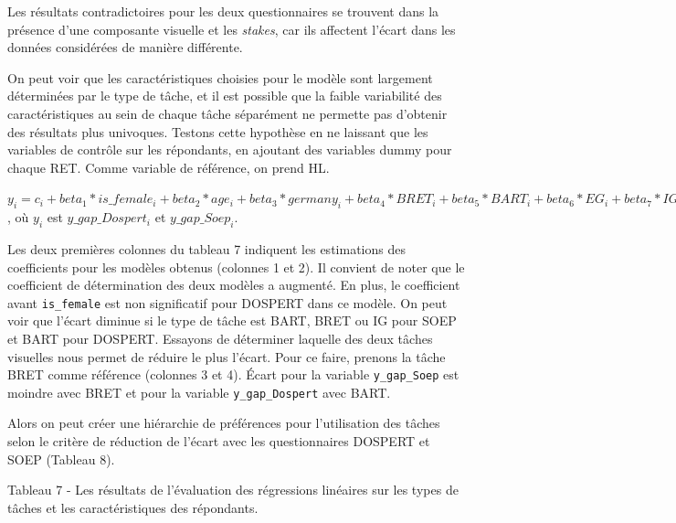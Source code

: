 \documentclass[12pt]{article}
\begin{document}
Les résultats contradictoires pour les deux questionnaires se trouvent
dans la présence d'une composante visuelle et les \emph{stakes}, car ils
affectent l'écart dans les données considérées de manière différente.

On peut voir que les caractéristiques choisies pour le modèle sont
largement déterminées par le type de tâche, et il est possible que la
faible variabilité des caractéristiques au sein de chaque tâche
séparément ne permette pas d'obtenir des résultats plus univoques.
Testons cette hypothèse en ne laissant que les variables de contrôle sur
les répondants, en ajoutant des variables dummy pour chaque RET. Comme
variable de référence, on prend HL.

\(y_i = c_i + beta_1 * is\_female_i+ beta_2 * age_i + beta_3 * germany_i + beta_4 * BRET_i + beta_5 * BART_i + beta_6 * EG_i + beta_7 * IG_i + epsilon_i\)
, où \(y_i\) est \(y\_gap\_Dospert_i\) et \(y\_gap\_Soep_i\).

Les deux premières colonnes du tableau 7 indiquent les estimations des
coefficients pour les modèles obtenus (colonnes 1 et 2). Il convient de
noter que le coefficient de détermination des deux modèles a augmenté.
En plus, le coefficient avant \texttt{is\_female} est non significatif
pour DOSPERT dans ce modèle. On peut voir que l'écart diminue si le type
de tâche est BART, BRET ou IG pour SOEP et BART pour DOSPERT. Essayons
de déterminer laquelle des deux tâches visuelles nous permet de réduire
le plus l'écart. Pour ce faire, prenons la tâche BRET comme référence
(colonnes 3 et 4). Écart pour la variable \texttt{y\_gap\_Soep} est
moindre avec BRET et pour la variable \texttt{y\_gap\_Dospert} avec
BART.

Alors on peut créer une hiérarchie de préférences pour l'utilisation des
tâches selon le critère de réduction de l'écart avec les questionnaires
DOSPERT et SOEP (Tableau 8).

\newpage

Tableau 7 - Les résultats de l'évaluation des régressions linéaires sur
les types de tâches et les caractéristiques des répondants.
\end{document}
